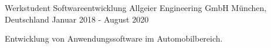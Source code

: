 \begin{cventries}
  \cventry
    {Werkstudent Softwareentwicklung} %
    {Allgeier Engineering GmbH} %
    {München, Deutschland} %
    {Januar 2018 - August 2020} %
    {
      \begin{cvitems} %
     	 \item {Entwicklung von Anwendungssoftware im Automobilbereich.}
      \end{cvitems}
    }

\end{cventries}
